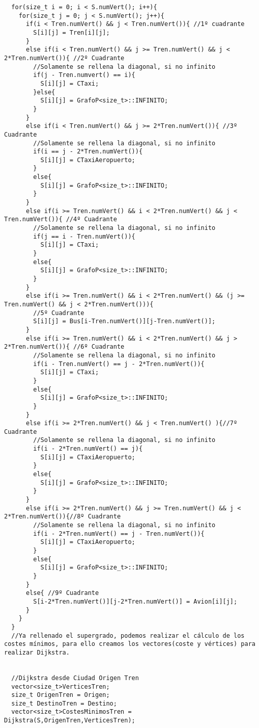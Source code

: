 \begin{verbatim}
  for(size_t i = 0; i < S.numVert(); i++){
    for(size_t j = 0; j < S.numVert(); j++){
      if(i < Tren.numVert() && j < Tren.numVert()){ //1º cuadrante
        S[i][j] = Tren[i][j];
      }
      else if(i < Tren.numVert() && j >= Tren.numVert() && j < 2*Tren.numVert()){ //2º Cuadrante
        //Solamente se rellena la diagonal, si no infinito
        if(j - Tren.numvert() == i){
          S[i][j] = CTaxi;
        }else{
          S[i][j] = GrafoP<size_t>::INFINITO;
        }
      }
      else if(i < Tren.numVert() && j >= 2*Tren.numVert()){ //3º Cuadrante
        //Solamente se rellena la diagonal, si no infinito
        if(i == j - 2*Tren.numVert()){
          S[i][j] = CTaxiAeropuerto;
        }
        else{
          S[i][j] = GrafoP<size_t>::INFINITO;
        }
      }
      else if(i >= Tren.numVert() && i < 2*Tren.numVert() && j < Tren.numVert()){ //4º Cuadrante
        //Solamente se rellena la diagonal, si no infinito
        if(j == i - Tren.numVert()){
          S[i][j] = CTaxi;
        }
        else{
          S[i][j] = GrafoP<size_t>::INFINITO;
        }
      }
      else if(i >= Tren.numVert() && i < 2*Tren.numVert() && (j >= Tren.numVert() && j < 2*Tren.numVert())){
        //5º Cuadrante
        S[i][j] = Bus[i-Tren.numVert()][j-Tren.numVert()];
      }
      else if(i >= Tren.numVert() && i < 2*Tren.numVert() && j > 2*Tren.numVert()){ //6º Cuadrante
        //Solamente se rellena la diagonal, si no infinito
        if(i - Tren.numVert() == j - 2*Tren.numVert()){
          S[i][j] = CTaxi;
        }
        else{
          S[i][j] = GrafoP<size_t>::INFINITO;
        }
      }
      else if(i >= 2*Tren.numVert() && j < Tren.numVert() ){//7º Cuadrante
        //Solamente se rellena la diagonal, si no infinito
        if(i - 2*Tren.numVert() == j){
          S[i][j] = CTaxiAeropuerto;
        }
        else{
          S[i][j] = GrafoP<size_t>::INFINITO;
        }
      }
      else if(i >= 2*Tren.numVert() && j >= Tren.numVert() && j < 2*Tren.numVert()){//8º Cuadrante
        //Solamente se rellena la diagonal, si no infinito
        if(i - 2*Tren.numVert() == j - Tren.numVert()){
          S[i][j] = CTaxiAeropuerto;
        }
        else{
          S[i][j] = GrafoP<size_t>::INFINITO;
        }
      }
      else{ //9º Cuadrante
        S[i-2*Tren.numVert()][j-2*Tren.numVert()] = Avion[i][j];
      }
    }
  }
  //Ya rellenado el supergrado, podemos realizar el cálculo de los costes mínimos, para ello creamos los vectores(coste y vértices) para realizar Dijkstra.


  //Dijkstra desde Ciudad Origen Tren
  vector<size_t>VerticesTren;
  size_t OrigenTren = Origen;
  size_t DestinoTren = Destino;
  vector<size_t>CostesMinimosTren = Dijkstra(S,OrigenTren,VerticesTren);


\end{verbatim}
